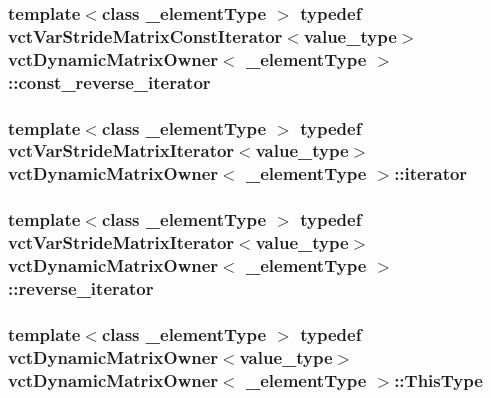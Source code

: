 \subsubsection[{const\+\_\+reverse\+\_\+iterator}]{\setlength{\rightskip}{0pt plus 5cm}template$<$class \+\_\+element\+Type $>$ typedef {\bf vct\+Var\+Stride\+Matrix\+Const\+Iterator}$<$value\+\_\+type$>$ {\bf vct\+Dynamic\+Matrix\+Owner}$<$ \+\_\+element\+Type $>$\+::{\bf const\+\_\+reverse\+\_\+iterator}}\label{classvct_dynamic_matrix_owner_a3f5a649a5285f9909e4628151d9cdac1}
\hypertarget{classvct_dynamic_matrix_owner_aa723836eb06a7ae230e80ec85a44e059}{}
\subsubsection[{iterator}]{\setlength{\rightskip}{0pt plus 5cm}template$<$class \+\_\+element\+Type $>$ typedef {\bf vct\+Var\+Stride\+Matrix\+Iterator}$<$value\+\_\+type$>$ {\bf vct\+Dynamic\+Matrix\+Owner}$<$ \+\_\+element\+Type $>$\+::{\bf iterator}}\label{classvct_dynamic_matrix_owner_aa723836eb06a7ae230e80ec85a44e059}
\hypertarget{classvct_dynamic_matrix_owner_afa1149b71fe5f3151ee890e65ea7e81b}{}
\subsubsection[{reverse\+\_\+iterator}]{\setlength{\rightskip}{0pt plus 5cm}template$<$class \+\_\+element\+Type $>$ typedef {\bf vct\+Var\+Stride\+Matrix\+Iterator}$<$value\+\_\+type$>$ {\bf vct\+Dynamic\+Matrix\+Owner}$<$ \+\_\+element\+Type $>$\+::{\bf reverse\+\_\+iterator}}\label{classvct_dynamic_matrix_owner_afa1149b71fe5f3151ee890e65ea7e81b}
\hypertarget{classvct_dynamic_matrix_owner_a6e693f28f71b3e0b7f5c62d334f99779}{}
\subsubsection[{This\+Type}]{\setlength{\rightskip}{0pt plus 5cm}template$<$class \+\_\+element\+Type $>$ typedef {\bf vct\+Dynamic\+Matrix\+Owner}$<$value\+\_\+type$>$ {\bf vct\+Dynamic\+Matrix\+Owner}$<$ \+\_\+element\+Type $>$\+::{\bf This\+Type}}\label{classvct_dynamic_matrix_owner_a6e693f28f71b3e0b7f5c62d334f99779}


